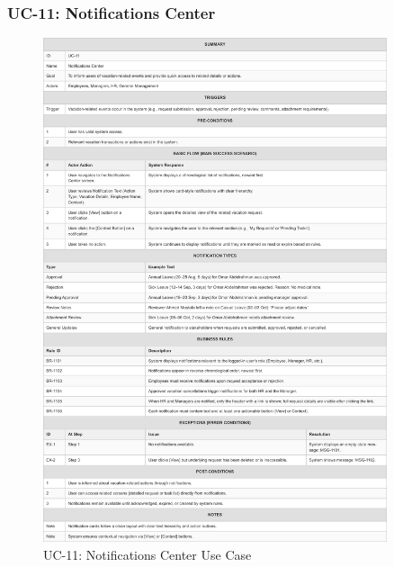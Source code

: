 \documentclass[12pt,a4paper]{article}
\begin{document}
\subsubsection{UC-11: Notifications Center}
\begin{figure}[H]
\centering
\includegraphics[width=0.9\textwidth]{Use-Cases/UC-11-Notifications-Center/UC-11-Notifications-Center-1.png}
\caption{UC-11: Notifications Center Use Case}
\label{fig:uc11}
\end{figure}
\end{document}
